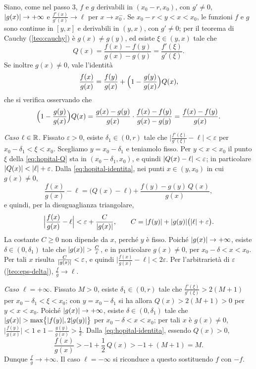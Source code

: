 \begin{dimostrazione}
Siano, come nel passo 3, $f$ e $g$ derivabili in $(x_{0}-r,x_{0})$, con $g'\neq0$,
$\lvert g(x)\rvert\to+\infty$ e $\frac{f'(x)}{g'(x)}\to\ell$ per $x\to x_{0}^{-}$. Se
$x_{0}-r<y<x<x_{0}$, le funzioni $f$ e $g$ sono continue in $[y,x]$ e derivabili in
$(y,x)$, con $g'\neq0$; per il teorema di Cauchy (\cref{teo:cauchy}) è $g(x)\neq g(y)$,
ed esiste $\xi\in(y,x)$ tale che
\begin{equation}\label{eq:hopital-Q}
  Q(x)=\frac{f(x)-f(y)}{g(x)-g(y)}=\frac{f'(\xi)}{g'(\xi)} .
\end{equation}
Se inoltre $g(x)\neq0$, vale l'identità
\begin{equation}\label{eq:hopital-identita}
  \frac{f(x)}{g(x)}=\frac{f(y)}{g(x)}+\Bigl(1-\frac{g(y)}{g(x)}\Bigr)Q(x),
\end{equation}
che si verifica osservando che
\[
  \Bigl(1-\frac{g(y)}{g(x)}\Bigr)Q(x)=\frac{g(x)-g(y)}{g(x)}\cdot
  \frac{f(x)-f(y)}{g(x)-g(y)}=\frac{f(x)-f(y)}{g(x)} .
\]

\emph{Caso $\ell\in\mathbb{R}$.} Fissato $\varepsilon>0$, esiste $\delta_{1}\in(0,r)$ tale che
$\bigl|\frac{f'(\xi)}{g'(\xi)}-\ell\bigr|<\varepsilon$ per $x_{0}-\delta_{1}<\xi<x_{0}$.
Scegliamo $y=x_{0}-\delta_{1}$ e teniamolo fisso. Per $y<x<x_{0}$ il punto $\xi$ della
\eqref{eq:hopital-Q} sta in $(x_{0}-\delta_{1},x_{0})$, e quindi
$\lvert Q(x)-\ell\rvert<\varepsilon$; in particolare $\lvert Q(x)\rvert<\lvert \ell\rvert+\varepsilon$. Dalla
\eqref{eq:hopital-identita}, nei punti $x\in(y,x_{0})$ in cui $g(x)\neq0$,
\[
  \frac{f(x)}{g(x)}-\ell=\bigl(Q(x)-\ell\bigr)+\frac{f(y)-g(y)\,Q(x)}{g(x)},
\]
e quindi, per la disuguaglianza triangolare,
\[
  \Bigl|\frac{f(x)}{g(x)}-\ell\Bigr|<\varepsilon+\frac{C}{\lvert g(x)\rvert}, \qquad
  C=\lvert f(y)\rvert+\lvert g(y)\rvert\bigl(\lvert \ell\rvert+\varepsilon\bigr).
\]
La costante $C\ge0$ non dipende da $x$, perché $y$ è fisso. Poiché
$\lvert g(x)\rvert\to+\infty$, esiste $\delta\in(0,\delta_{1})$ tale che
$\lvert g(x)\rvert>\frac{C}{\varepsilon}$, e in particolare $g(x)\neq0$, per
$x_{0}-\delta<x<x_{0}$. Per tali $x$ risulta $\frac{C}{\lvert g(x)\rvert}<\varepsilon$, e quindi
$\bigl|\frac{f(x)}{g(x)}-\ell\bigr|<2\varepsilon$. Per l'arbitrarietà di $\varepsilon$
(\cref{teo:eps-delta}), $\frac fg\to\ell$.

\emph{Caso $\ell=+\infty$.} Fissato $M>0$, esiste $\delta_{1}\in(0,r)$ tale che
$\frac{f'(\xi)}{g'(\xi)}>2(M+1)$ per $x_{0}-\delta_{1}<\xi<x_{0}$; con $y=x_{0}-\delta_{1}$
si ha allora $Q(x)>2(M+1)>0$ per $y<x<x_{0}$. Poiché $\lvert g(x)\rvert\to+\infty$, esiste
$\delta\in(0,\delta_{1})$ tale che $\lvert g(x)\rvert>\max\bigl\{\lvert f(y)\rvert,2\lvert g(y)\rvert\bigr\}$
per $x_{0}-\delta<x<x_{0}$; per tali $x$ è $g(x)\neq0$,
$\bigl|\frac{f(y)}{g(x)}\bigr|<1$ e $1-\frac{g(y)}{g(x)}>\frac12$. Dalla
\eqref{eq:hopital-identita}, essendo $Q(x)>0$,
\[
  \frac{f(x)}{g(x)}>-1+\frac12\,Q(x)>-1+(M+1)=M .
\]
Dunque $\frac fg\to+\infty$. Il caso $\ell=-\infty$ si riconduce a questo sostituendo $f$
con $-f$.
\end{dimostrazione}

